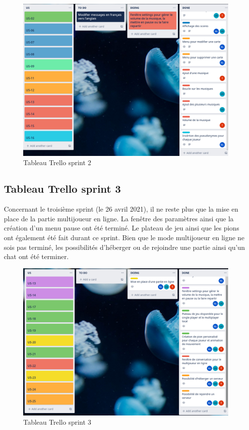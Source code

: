 \begin{figure}[h]
	\centering
	\includegraphics[width=\textwidth]{trello2.png}
	\caption{Tableau Trello sprint 2}
	\label{fig:Trello_sprint_2}
\end{figure}

\newpage
\subsection{Tableau Trello sprint 3}
Concernant le troisième sprint (le 26 avril 2021), il ne reste plus que la mise en place de la partie multijoueur en ligne.
La fenêtre des paramètres ainsi que la création d'un menu pause ont été terminé. 
Le plateau de jeu ainsi que les pions ont également été fait durant ce sprint.
Bien que le mode multijoueur en ligne ne sois pas terminé, les possibilités d'héberger ou de rejoindre une partie ainsi qu'un chat ont été terminer.

\begin{figure}[h]
	\centering
	\includegraphics[width=\textwidth]{trello3.png}
	\caption{Tableau Trello sprint 3}
	\label{fig:Trello_sprint_3}
\end{figure}